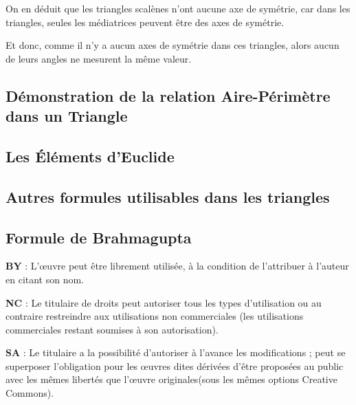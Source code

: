 \documentclass[a4paper, twoside]{article}
\begin{document}
On en déduit que les triangles scalènes n'ont aucune axe de symétrie,
car dans les triangles, seules les médiatrices peuvent être des axes de symétrie.

Et donc, comme il n'y a aucun axes de symétrie dans ces triangles,
alors aucun de leurs angles ne mesurent la même valeur.

\subsection*{Démonstration de la relation Aire-Périmètre dans un Triangle} \label{relation_aire_perim_triangle}

\subsection*{Les Éléments d'Euclide} \label{euclide_element}

\subsection*{Autres formules utilisables dans les triangles} \label{al_kashi_autre_formule}


\subsection*{Formule de Brahmagupta} \label{formule_de_Brahmagupta}



\newpage

\hfill

\textbf{BY} : L'œuvre peut être librement utilisée, à la condition de l'attribuer à l'auteur en citant son nom.

\textbf{NC} : Le titulaire de droits peut autoriser tous les types d’utilisation ou au contraire restreindre aux 
utilisations non commerciales (les utilisations commerciales restant soumises à son autorisation).

\textbf{SA} : Le titulaire a la possibilité d'autoriser à l'avance les modifications ; 
peut se superposer l'obligation pour les œuvres dites dérivées d'être proposées
au public avec les mêmes libertés que l'œuvre originales(sous les mêmes options Creative Commons).

\bigbreak

\end{document}
